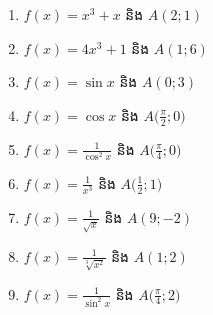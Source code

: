 \documentclass[12pt,a4paper]{article}
\begin{document}
\begin{enumerate}[I]
		\begin{multicols}{2}
			\begin{enumerate}[a]
				\item $f(x)=x^3+x$ និង $A(2;1)$
				\item $f(x)=4x^3+1$ និង $A(1;6)$
				\item $f(x)=\sin x$ និង $A(0;3)$
				\item $f(x)=\cos x$ និង $A\bigg(\frac{\pi}{2};0\bigg)$
				\item $f(x)=\frac{1}{\cos^2 x}$ និង $A\bigg(\frac{\pi}{4}; 0\bigg)$
				\item $f(x)=\frac{1}{x^3}$ និង $A\bigg(\frac{1}{2}; 1\bigg)$
				\item $f(x)=\frac{1}{\sqrt{x}}$ និង $A(9;-2)$
				\item $f(x)=\frac{1}{\sqrt[3]{x^2}}$ និង $A(1;2)$
				\item $f(x)=\frac{1}{\sin^2x}$ និង $A\bigg(\frac{\pi}{4};2\bigg)$
				

\end{enumerate}
\end{multicols}
\end{enumerate}
\end{document}
